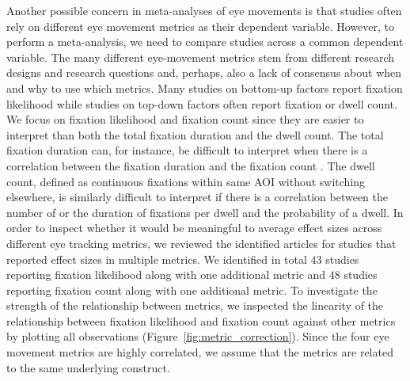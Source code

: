 \documentclass{article}
\begin{document}
Another possible concern in meta-analyses of eye movements is that studies often rely on different eye movement metrics as their dependent variable. However, to perform a meta-analysis, we need to compare studies across a common dependent variable. The many different eye-movement metrics stem from different research designs and research questions and, perhaps, also a lack of consensus about when and why to use which metrics. Many studies on bottom-up factors report fixation likelihood while studies on top-down factors often report fixation or dwell count. We focus on fixation likelihood and fixation count since they are easier to interpret than both the total fixation duration and the dwell count. The total fixation duration can, for instance, be difficult to interpret when there is a correlation between the fixation duration and the fixation count \citep{orquin2018a,orquin2019a}. The dwell count, defined as continuous fixations within same AOI without switching elsewhere, is similarly difficult to interpret if there is a correlation between the number of or the duration of fixations per dwell and the probability of a dwell. In order to inspect whether it would be meaningful to average effect sizes across different eye tracking metrics, we reviewed the identified articles for studies that reported effect sizes in multiple metrics. We identified in total $43$ studies reporting fixation likelihood along with one additional metric and $48$ studies reporting fixation count along with one additional metric. To investigate the strength of the relationship between metrics, we inspected the linearity of the relationship between fixation likelihood and fixation count against other metrics by plotting all observations (Figure~\ref{fig:metric_correction}). Since the four eye movement metrics are highly correlated, we assume that the metrics are related to the same underlying construct. 
\end{document}
